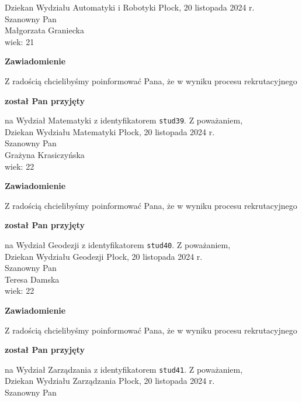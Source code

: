 \documentclass[12pt,a4paper]{article}
\begin{document}
Dziekan
Wydziału Automatyki i Robotyki
\newpage
\hfill Płock, 20 listopada 2024 r.\\
\noindent 
Szanowny Pan \\
Małgorzata Graniecka \\
wiek: 21
\bigskip
\begin{center}
 	{\Large\textbf{Zawiadomienie}}
\end{center}
\bigskip
Z radością chcielibyśmy poinformować Pana, że w wyniku procesu rekrutacyjnego 
\begin{center}
\textsf{\textbf{został Pan przyjęty}} 
\end{center}
na Wydział Matematyki z identyfikatorem \verb|stud39|. 
\vspace{2cm}
\noindent
Z poważaniem,\\
Dziekan
Wydziału Matematyki
\newpage
\hfill Płock, 20 listopada 2024 r.\\
\noindent 
Szanowny Pan \\
Grażyna Krasiczyńska \\
wiek: 22
\bigskip
\begin{center}
 	{\Large\textbf{Zawiadomienie}}
\end{center}
\bigskip
Z radością chcielibyśmy poinformować Pana, że w wyniku procesu rekrutacyjnego 
\begin{center}
\textsf{\textbf{został Pan przyjęty}} 
\end{center}
na Wydział Geodezji z identyfikatorem \verb|stud40|. 
\vspace{2cm}
\noindent
Z poważaniem,\\
Dziekan
Wydziału Geodezji
\newpage
\hfill Płock, 20 listopada 2024 r.\\
\noindent 
Szanowny Pan \\
Teresa Damska \\
wiek: 22
\bigskip
\begin{center}
 	{\Large\textbf{Zawiadomienie}}
\end{center}
\bigskip
Z radością chcielibyśmy poinformować Pana, że w wyniku procesu rekrutacyjnego 
\begin{center}
\textsf{\textbf{został Pan przyjęty}} 
\end{center}
na Wydział Zarządzania z identyfikatorem \verb|stud41|. 
\vspace{2cm}
\noindent
Z poważaniem,\\
Dziekan
Wydziału Zarządzania
\newpage
\hfill Płock, 20 listopada 2024 r.\\
\noindent 
Szanowny Pan \\
\end{document}
